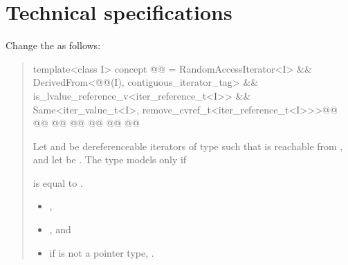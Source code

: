 \chapter{Technical specifications}
Change the  as follows:
\begin{quote}
\begin{codeblock}
template<class I>
  concept @@ =
    RandomAccessIterator<I> &&
    DerivedFrom<@@(I), contiguous_iterator_tag> &&
    is_lvalue_reference_v<iter_reference_t<I>> &&
    Same<iter_value_t<I>, remove_cvref_t<iter_reference_t<I>>>@\changed{;}{ \&\&}@
    @@
      @@
    @\added{\} \&\&}@
    @@
      @@
    @\added{\});}@
\end{codeblock}

\setcounter{Paras}{1}
\pnum
Let  and  be dereferenceable iterators  of type 
such that  is reachable from  ,
and let  be .
The type  models  only if
\begin{removedblock}
is equal to
.
\end{removedblock}
\begin{addedblock}
\begin{itemize}
\item
  ,
\item
  , and
\item
  if  is not a pointer type, .
\end{itemize}
\end{addedblock}
\end{quote}

